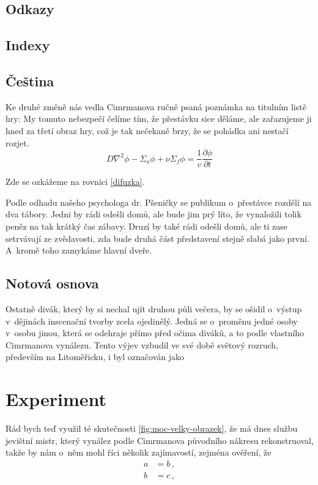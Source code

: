 \documentclass{cygclanek}
\begin{document}
\subsection{Odkazy}

\subsection{Indexy}

\subsection{Čeština}











Ke druhé změně \cite{trace_parcs} nás vedla Cimrmanova ručně psaná poznámka na titulním listě hry:
 My tomuto nebezpečí čelíme tím, že
přestávku sice děláme, ale zařazujeme ji hned za třetí obraz hry, což je tak
nečekaně brzy, že se pohádka ani nestačí rozjet. 
\begin{equation}
  D\nabla^2\phi - \Sigma_a\phi + \nu\Sigma_f\phi = \frac{1}{v}\frac{\partial
  \phi}{\partial t}
  \label{difuzka}
\end{equation}

Zde se ozkážeme na rovnici \eqref{difuzka}. 

Podle odhadu našeho psychologa
dr. Pšeničky se publikum o~přestávce rozdělí na dva tábory. Jedni by rádi
odešli domů, ale bude jim prý líto, že vynaložili tolik peněz na tak krátký čas
zábavy. Druzí by také rádi odešli domů, ale ti zase setrvávají ze zvědavosti,
zda bude druhá část představení stejně slabá jako první. A~kromě toho zamykáme
hlavní dveře.


\subsection{Notová osnova}
Ostatně divák, který by si nechal ujít druhou půli večera, by se ošidil
o~výstup v~dějinách inscenační tvorby zcela ojedinělý. Jedná se o~proměnu jedné
osoby v~osobu jinou, která se odehraje přímo před očima diváků, a to podle
vlastního Cimrmanova vynálezu. Tento výjev vzbudil ve své době světový rozruch,
především na Litoměřicku, i byl označován jako 


\section{Experiment}
Rád bych teď využil té skutečnosti \ref{fig:moc-velky-obrazek}, že má dnes
službu jevištní mistr, který vynález podle Cimrmanova původního nákresu
rekonstruoval, takže by nám o~něm mohl říci několik zajímavostí, zejména
ověření, že 
\begin{align}
  a &= b \label{rovnice_a} \,,\\
  b &= c \label{rovnice_b} \,,
\end{align}
\end{document}
